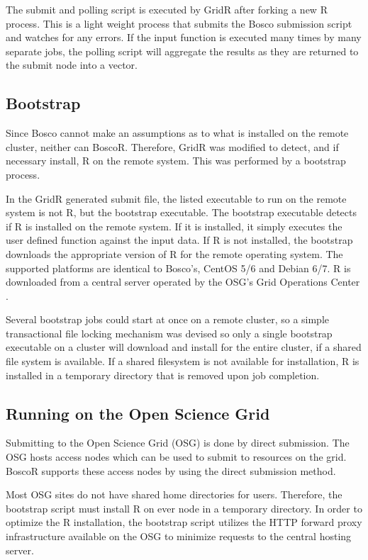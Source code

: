 \documentclass[conference]{IEEEtran}
\begin{document}
The submit and polling script is executed by GridR after forking a new R process.  This is a light weight process that submits the Bosco submission script and watches for any errors.  If the input function is executed many times by many separate jobs, the polling script will aggregate the results as they are returned to the submit node into a vector.  

\subsection{Bootstrap}
\label{sec:bootstrap}

Since Bosco cannot make an assumptions as to what is installed on the remote cluster, neither can BoscoR.  Therefore, GridR was modified to detect, and if necessary install, R on the remote system.  This was performed by a bootstrap process.

In the GridR generated submit file, the listed executable to run on the remote system is not R, but the bootstrap executable.  The bootstrap executable detects if R is installed on the remote system.  If it is installed, it simply executes the user defined function against the input data.  If R is not installed, the bootstrap downloads the appropriate version of R for the remote operating system.  The supported platforms are identical to Bosco's, CentOS 5/6 and Debian 6/7.  R is downloaded from a central server operated by the OSG's Grid Operations Center \cite{osgoperations}.  

Several bootstrap jobs could start at once on a remote cluster, so a simple transactional file locking mechanism was devised so only a single bootstrap executable on a cluster will download and install for the entire cluster, if a shared file system is available.  If a shared filesystem is not available for installation, R is installed in a temporary directory that is removed upon job completion.

\subsection{Running on the Open Science Grid}

Submitting to the Open Science Grid (OSG) is done by direct submission.  The OSG hosts access nodes which can be used to submit to resources on the grid.  BoscoR supports these access nodes by using the direct submission method.

Most OSG sites do not have shared home directories for users.  Therefore, the bootstrap script must install R on ever node in a temporary directory.  In order to optimize the R installation, the bootstrap script utilizes the HTTP forward proxy infrastructure available on the OSG to minimize requests to the central hosting server.
\end{document}

